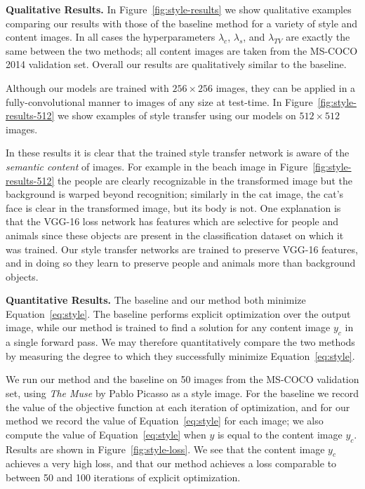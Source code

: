 \documentclass[runningheads]{llncs}
\begin{document}
\vspace{1mm}
\noindent \textbf{Qualitative Results.}
In Figure~\ref{fig:style-results} we show qualitative examples comparing our results with those
of the baseline method for a variety of style and content images. In all cases the hyperparameters
$\lambda_c$, $\lambda_s$, and $\lambda_{TV}$ are exactly the same between the two methods; all
content images are taken from the MS-COCO 2014 validation set. Overall our results
are qualitatively similar to the baseline.

Although our models are trained with $256\times256$ images, they can be applied in a fully-convolutional
manner to images of any size at test-time. In Figure~\ref{fig:style-results-512} we show examples
of style transfer using our models on $512\times512$ images.

In these results it is clear that the trained style transfer network is aware of the
\emph{semantic content} of images. For example in
the beach image in Figure~\ref{fig:style-results-512} the people are clearly recognizable in the
transformed image but the background is warped beyond recognition; similarly in the cat image,
the cat's face is clear in the transformed image, but its body is not. One
explanation is that the VGG-16 loss network has features which are selective for people and animals
since these objects are present in the classification dataset on which it was trained. Our style
transfer networks are trained to preserve VGG-16 features, and in doing so they learn to preserve
people and animals more than background objects.

\vspace{1mm}
\noindent \textbf{Quantitative Results.}
The baseline and our method both minimize Equation~\ref{eq:style}. The baseline performs explicit
optimization over the output image, while our method is trained to find a solution for any
content image $y_c$ in a single forward pass. We may therefore quantitatively compare the two
methods by measuring the degree to which they successfully minimize Equation~\ref{eq:style}.

We run our method and the baseline on 50 images from the MS-COCO validation set, using
\emph{The Muse} by Pablo Picasso as a style image. For the baseline we record the value of the
objective function at each iteration of optimization, and for our method we record the value
of Equation~\ref{eq:style} for each image; we also compute the value of Equation~\ref{eq:style}
when $y$ is equal to the content image $y_c$. Results are shown in Figure~\ref{fig:style-loss}.
We see that the content image $y_c$ achieves a very high loss, and that our method achieves a
loss comparable to between 50 and 100 iterations of explicit optimization.
\end{document}
